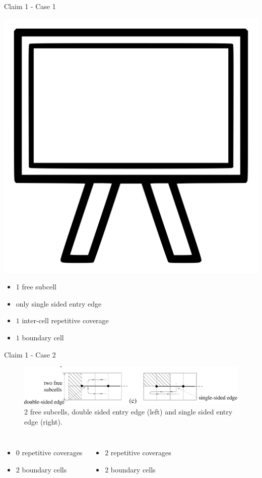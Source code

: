 \documentclass{beamer}
\begin{document}
\begin{frame}{Claim 1 - Case 1}
    \centerline{\includegraphics[width=0.2\linewidth]{Images/board.png}}
    \begin{itemize}
        \item 1 free subcell
        \item only single sided entry edge
        \item $1$ inter-cell repetitive coverage
        \item $1$ boundary cell
    \end{itemize}
\end{frame}

\begin{frame}{Claim 1 - Case 2}
    \begin{figure}
        \includegraphics[width=\linewidth]{Images/inv_10_bot.png}
        \caption{2 free subcells, double sided entry edge (left) and single sided entry edge (right).}
    \end{figure}
    \begin{columns}
        \begin{itemize}
            \item $0$ repetitive coverages
            \item $2$ boundary cells
        \end{itemize}

        \begin{itemize}
            \item $2$ repetitive coverages
            \item $2$ boundary cells
        \end{itemize}
    \end{columns}
\end{frame}
\end{document}
